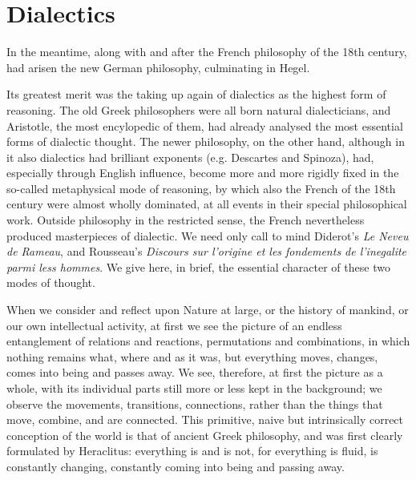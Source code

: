 \chapter{Dialectics}

In the meantime, along with and after the French philosophy of the 18th century,
had arisen the new German philosophy, culminating in Hegel.

Its greatest merit was the taking up again of dialectics as the highest form of
reasoning. The old Greek philosophers were all born natural dialecticians, and
Aristotle, the most encylopedic of them, had already analysed the most essential
forms of dialectic thought. The newer philosophy, on the other hand, although in
it also dialectics had brilliant exponents (e.g. Descartes and Spinoza), had,
especially through English influence, become more and more rigidly fixed in the
so-called metaphysical mode of reasoning, by which also the French of the 18th
century were almost wholly dominated, at all events in their special
philosophical work. Outside philosophy in the restricted sense, the French
nevertheless produced masterpieces of dialectic. We need only call to mind
Diderot's \emph{Le Neveu de Rameau}, and Rousseau's \emph{Discours sur l'origine
et les fondements de l'inegalite parmi less hommes}. We give here, in brief, the
essential character of these two modes of thought.

When we consider and reflect upon Nature at large, or the history of mankind, or
our own intellectual activity, at first we see the picture of an endless
entanglement of relations and reactions, permutations and combinations, in which
nothing remains what, where and as it was, but everything moves, changes, comes
into being and passes away. We see, therefore, at first the picture as a whole,
with its individual parts still more or less kept in the background; we observe
the movements, transitions, connections, rather than the things that move,
combine, and are connected. This primitive, naive but intrinsically correct
conception of the world is that of ancient Greek philosophy, and was first
clearly formulated by Heraclitus: everything is and is not, for everything is
fluid, is constantly changing, constantly coming into being and passing
away.

\printendnotes